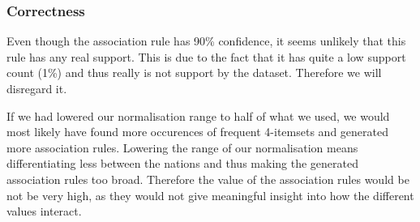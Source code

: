 \subsubsection{Correctness}
\label{Res_FP_Cor}
Even though the association rule has 90\% confidence, it seems unlikely that this rule has any real support. This is due to the fact that it has quite a low support count (1\%) and thus really is not support by the dataset. Therefore we will disregard it.

If we had lowered our normalisation range to half of what we used, we would most likely have found more occurences of frequent 4-itemsets and generated more association rules. Lowering the range of our normalisation means differentiating less between the nations and thus making the generated association rules too broad. Therefore the value of the association rules would be not be very high, as they would not give meaningful insight into how the different values interact.